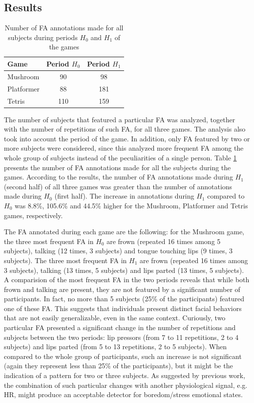 \subsection{Results}

\begin{table}[h!]
\caption{Number of FA annotations made for all subjects during periods $H_0$ and $H_1$ of the games}
\label{table:amount-fa}
\centering
\begin{tabular}{lcc}%
\toprule%
\textbf{Game} & \textbf{Period $H_0$} & \textbf{Period $H_1$} \\
\midrule
Mushroom   & 90 & 98 \\
Platformer & 88 & 181 \\
Tetris     & 110 & 159 \\
\bottomrule%
\end{tabular}%
\end{table}

The number of subjects that featured a particular FA was analyzed, together with the number of repetitions of such FA, for all three games. The analysis also took into account the period of the game. In addition, only FA featured by two or more subjects were considered, since this analyzed more frequent FA among the whole group of subjects instead of the peculiarities of a single person. Table \ref{table:amount-fa} presents the number of FA annotations made for all the subjects during the games. According to the results, the number of FA annotations made during $H_1$ (second half) of all three games was greater than the number of annotations made during $H_0$ (first half). The increase in annotations during $H_1$ compared to $H_0$ was 8.8\%, 105.6\% and 44.5\% higher for the Mushroom, Platformer and Tetris games, respectively.

The FA annotated during each game are the following: for the Mushroom game, the three most frequent FA in $H_0$ are frown (repeated 16 times among 5 subjects), talking (12 times, 3 subjects) and tongue touching lips (9 times, 3 subjects). The three most frequent FA in $H_1$ are frown (repeated 16 times among 3 subjects), talking (13 times, 5 subjects) and lips parted (13 times, 5 subjects). A comparision of the most frequent FA in the two periods reveals that while both frown and talking are present, they are not featured by a significant number of participants. In fact, no more than 5 subjects (25\% of the participants) featured one of these FA. This suggests that individuals present distinct facial behaviors that are not easily generalizable, even in the same context. Curiously, two particular FA presented a significant change in the number of repetitions and subjects between the two periods: lip pressors (from 7 to 11 repetitions, 2 to 4 subjects) and lips parted (from 5 to 13 repetitions, 2 to 5 subjects). When compared to the whole group of participants, such an increase is not significant (again they represent less than 25\% of the participants), but it might be the indication of a pattern for two or three subjects. As suggested by previous work, the combination of such particular changes with another physiological signal, e.g. HR, might produce an acceptable detector for boredom/stress emotional states.

